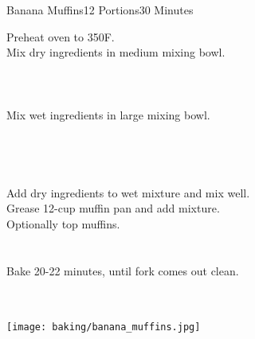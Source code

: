 \begin{recipe}{Banana Muffins}{12 Portions}{30 Minutes}

Preheat oven to 350\degrees F.\\

Mix dry ingredients in medium mixing bowl.\\~\\~\\~\\

Mix wet ingredients in large mixing bowl.\\~\\~\\~\\~\\

\newstep
Add dry ingredients to wet mixture and mix well.\\

\newstep
Grease 12-cup muffin pan and add mixture.\\

Optionally top muffins.\\~\\~\\

\newstep
Bake 20-22 minutes, until fork comes out clean.

\end{recipe}

\begin{center}
~\\~\\
\texttt{[image: baking/banana\_muffins.jpg]}
\end{center}